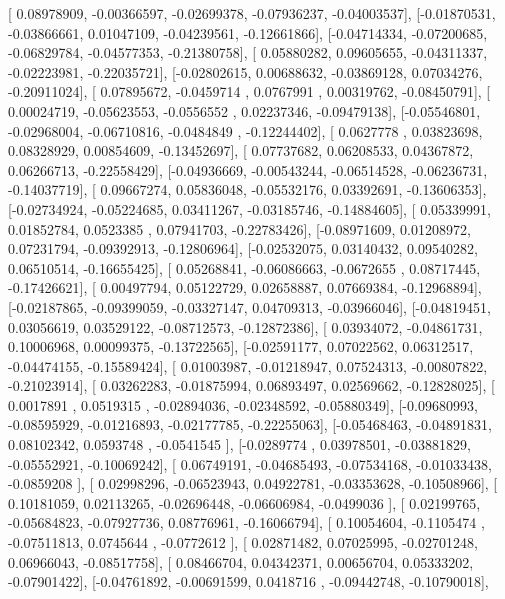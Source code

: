 \documentclass{article}
\begin{document}
       [ 0.08978909, -0.00366597, -0.02699378, -0.07936237, -0.04003537],
       [-0.01870531, -0.03866661,  0.01047109, -0.04239561, -0.12661866],
       [-0.04714334, -0.07200685, -0.06829784, -0.04577353, -0.21380758],
       [ 0.05880282,  0.09605655, -0.04311337, -0.02223981, -0.22035721],
       [-0.02802615,  0.00688632, -0.03869128,  0.07034276, -0.20911024],
       [ 0.07895672, -0.0459714 ,  0.0767991 ,  0.00319762, -0.08450791],
       [ 0.00024719, -0.05623553, -0.0556552 ,  0.02237346, -0.09479138],
       [-0.05546801, -0.02968004, -0.06710816, -0.0484849 , -0.12244402],
       [ 0.0627778 ,  0.03823698,  0.08328929,  0.00854609, -0.13452697],
       [ 0.07737682,  0.06208533,  0.04367872,  0.06266713, -0.22558429],
       [-0.04936669, -0.00543244, -0.06514528, -0.06236731, -0.14037719],
       [ 0.09667274,  0.05836048, -0.05532176,  0.03392691, -0.13606353],
       [-0.02734924, -0.05224685,  0.03411267, -0.03185746, -0.14884605],
       [ 0.05339991,  0.01852784,  0.0523385 ,  0.07941703, -0.22783426],
       [-0.08971609,  0.01208972,  0.07231794, -0.09392913, -0.12806964],
       [-0.02532075,  0.03140432,  0.09540282,  0.06510514, -0.16655425],
       [ 0.05268841, -0.06086663, -0.0672655 ,  0.08717445, -0.17426621],
       [ 0.00497794,  0.05122729,  0.02658887,  0.07669384, -0.12968894],
       [-0.02187865, -0.09399059, -0.03327147,  0.04709313, -0.03966046],
       [-0.04819451,  0.03056619,  0.03529122, -0.08712573, -0.12872386],
       [ 0.03934072, -0.04861731,  0.10006968,  0.00099375, -0.13722565],
       [-0.02591177,  0.07022562,  0.06312517, -0.04474155, -0.15589424],
       [ 0.01003987, -0.01218947,  0.07524313, -0.00807822, -0.21023914],
       [ 0.03262283, -0.01875994,  0.06893497,  0.02569662, -0.12828025],
       [ 0.0017891 ,  0.0519315 , -0.02894036, -0.02348592, -0.05880349],
       [-0.09680993, -0.08595929, -0.01216893, -0.02177785, -0.22255063],
       [-0.05468463, -0.04891831,  0.08102342,  0.0593748 , -0.0541545 ],
       [-0.0289774 ,  0.03978501, -0.03881829, -0.05552921, -0.10069242],
       [ 0.06749191, -0.04685493, -0.07534168, -0.01033438, -0.0859208 ],
       [ 0.02998296, -0.06523943,  0.04922781, -0.03353628, -0.10508966],
       [ 0.10181059,  0.02113265, -0.02696448, -0.06606984, -0.0499036 ],
       [ 0.02199765, -0.05684823, -0.07927736,  0.08776961, -0.16066794],
       [ 0.10054604, -0.1105474 , -0.07511813,  0.0745644 , -0.0772612 ],
       [ 0.02871482,  0.07025995, -0.02701248,  0.06966043, -0.08517758],
       [ 0.08466704,  0.04342371,  0.00656704,  0.05333202, -0.07901422],
       [-0.04761892, -0.00691599,  0.0418716 , -0.09442748, -0.10790018],
\end{document}
